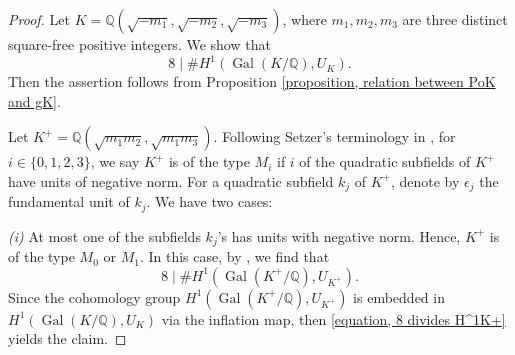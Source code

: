 \documentclass[12pt]{amsart}
\theoremstyle{definition}
\numberwithin{equation}{section}
\DeclareMathOperator{\Gal}{Gal}
\begin{document}
\begin{proof}
Let $K=\mathbb{Q}(\sqrt{-m_1},\sqrt{-m_2},\sqrt{-m_3})$, where $m_1,m_2,m_3$ are three distinct square-free positive integers. We show that 
\begin{equation*} 
	8 \mid \# H^1(\Gal(K/\mathbb{Q}),U_K).
\end{equation*}
Then the assertion follows from Proposition \ref{proposition, relation between PoK and gK}. 

Let $K^+=\mathbb{Q}(\sqrt{m_1m_2},\sqrt{m_1m_3})$. Following Setzer's terminology in \cite{Bennett},  for $i\in\{0,1,2,3\}$, we say $K^+$ is of the type $M_i$  if $i$ of the quadratic subfields of $K^+$ have units of negative norm. For a quadratic subfield $k_j$ of $K^+$, denote by $\epsilon_j$ the fundamental unit of $k_j$. 
 We have two cases:
 	
\smallskip
\textit{(i)}
	At most one of the subfields $k_j$'s has units with negative norm. Hence, $K^+$ is of the type $M_0$ or $M_1$. In this case, by \cite[Table I]{Bennett}, we find that
	\begin{equation} \label{equation, 8 divides H^1K+}
		8 \mid \# H^1(\Gal(K^+/\mathbb{Q}),U_{K^+}).
	\end{equation}
Since the cohomology group $H^1(\Gal(K^+/\mathbb{Q}),U_{K^+})$ is embedded in $H^1(\Gal(K/\mathbb{Q}),U_K)$ via the {inflation map}, then \eqref{equation, 8 divides H^1K+} yields the claim.


\end{proof}
\end{document}
